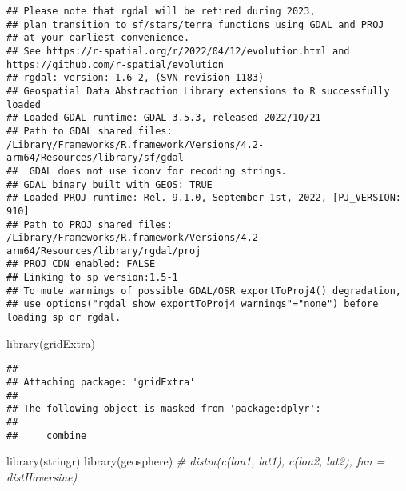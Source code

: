 \documentclass[
]{article}
\newenvironment{Shaded}{\begin{snugshade}}{\end{snugshade}}
\newcommand{\CommentTok}[1]{\textcolor[rgb]{0.56,0.35,0.01}{\textit{#1}}}
\newcommand{\FunctionTok}[1]{\textcolor[rgb]{0.00,0.00,0.00}{#1}}
\newcommand{\NormalTok}[1]{#1}
\begin{document}
\begin{verbatim}
## Please note that rgdal will be retired during 2023,
## plan transition to sf/stars/terra functions using GDAL and PROJ
## at your earliest convenience.
## See https://r-spatial.org/r/2022/04/12/evolution.html and https://github.com/r-spatial/evolution
## rgdal: version: 1.6-2, (SVN revision 1183)
## Geospatial Data Abstraction Library extensions to R successfully loaded
## Loaded GDAL runtime: GDAL 3.5.3, released 2022/10/21
## Path to GDAL shared files: /Library/Frameworks/R.framework/Versions/4.2-arm64/Resources/library/sf/gdal
##  GDAL does not use iconv for recoding strings.
## GDAL binary built with GEOS: TRUE 
## Loaded PROJ runtime: Rel. 9.1.0, September 1st, 2022, [PJ_VERSION: 910]
## Path to PROJ shared files: /Library/Frameworks/R.framework/Versions/4.2-arm64/Resources/library/rgdal/proj
## PROJ CDN enabled: FALSE
## Linking to sp version:1.5-1
## To mute warnings of possible GDAL/OSR exportToProj4() degradation,
## use options("rgdal_show_exportToProj4_warnings"="none") before loading sp or rgdal.
\end{verbatim}

\begin{Shaded}
\begin{Highlighting}[]
\FunctionTok{library}\NormalTok{(gridExtra)}
\end{Highlighting}
\end{Shaded}

\begin{verbatim}
## 
## Attaching package: 'gridExtra'
## 
## The following object is masked from 'package:dplyr':
## 
##     combine
\end{verbatim}

\begin{Shaded}
\begin{Highlighting}[]
\FunctionTok{library}\NormalTok{(stringr)}
\FunctionTok{library}\NormalTok{(geosphere)}
\CommentTok{\# distm(c(lon1, lat1), c(lon2, lat2), fun = distHaversine)}
\end{Highlighting}
\end{Shaded}
\end{document}
